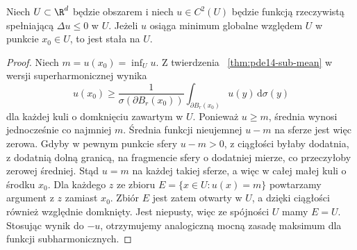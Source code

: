 \begin{twierdzenie}
\label{thm:pde14-strong-super}
Niech $U\subset\R^d$ będzie obszarem i niech
$u\in C^2(U)$ będzie funkcją rzeczywistą spełniającą
$\Delta u\le0$ w $U$.
Jeżeli $u$ osiąga minimum globalne względem $U$ w punkcie
$x_0\in U$, to jest stała na $U$.
\end{twierdzenie}
\begin{proof}
Niech $m=u(x_0)=\inf_Uu$. Z twierdzenia
~\ref{thm:pde14-sub-mean} w wersji superharmonicznej wynika
\[
 u(x_0)\ge\frac{1}{\sigma(\partial B_r(x_0))}
 \int_{\partial B_r(x_0)}u(y)\,\mathrm d\sigma(y)
\]
dla każdej kuli o domknięciu zawartym w $U$.
Ponieważ $u\ge m$, średnia wynosi jednocześnie co
najmniej $m$. Średnia funkcji nieujemnej $u-m$
na sferze jest więc zerowa. Gdyby w pewnym punkcie
sfery $u-m>0$, z ciągłości byłaby dodatnia, z dodatnią
dolną granicą, na fragmencie sfery o dodatniej mierze,
co przeczyłoby zerowej średniej. Stąd $u=m$ na każdej
takiej sferze, a więc w całej małej kuli o środku $x_0$.
Dla każdego $z$ ze zbioru $E=\{x\in U:u(x)=m\}$
powtarzamy argument z $z$ zamiast $x_0$. Zbiór $E$ jest
zatem otwarty w $U$, a dzięki ciągłości również względnie
domknięty. Jest niepusty, więc ze spójności $U$ mamy $E=U$.
Stosując wynik do $-u$, otrzymujemy analogiczną mocną
zasadę maksimum dla funkcji subharmonicznych.
\end{proof}

